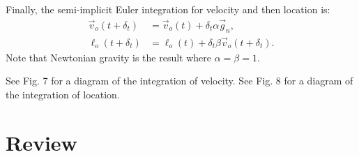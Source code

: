 \documentclass[12pt]{article}
\begin{document}
Finally, the semi-implicit Euler integration for velocity and then location is:
\begin{align}
\label{eq_velocity}
\vec{v}_{o}(t + \delta_t) &= \vec{v}_{o}(t) + \delta_{t} \alpha \vec{g}_n, \\
\label{eq_position}
\ell_{o}(t + \delta_t) &= \ell_{o}(t) + \delta_{t} \beta \vec{v}_{o}(t + \delta_t).
\end{align}
Note that Newtonian gravity is the result where $\alpha = \beta = 1$.

See Fig. 7 for a diagram of the integration of velocity.
See Fig. 8 for a diagram of the integration of location.




\section {Review}
\end{document}
